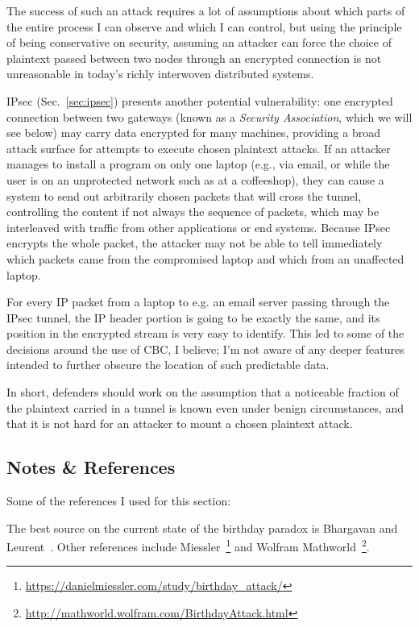 The success of such an attack requires a lot of assumptions about
which parts of the entire process I can observe and which I can
control, but using the principle of being conservative on security,
assuming an attacker can force the choice of plaintext passed between
two nodes through an encrypted connection is not unreasonable in
today's richly interwoven distributed systems.

IPsec (Sec.~\ref{sec:ipsec}) presents another potential vulnerability:
one encrypted connection between two gateways (known as a
\emph{Security Association}, which we will see below) may carry data
encrypted for many machines, providing a broad attack surface for
attempts to execute chosen plaintext attacks.  If an attacker manages
to install a program on only one laptop (e.g., via email, or while the
user is on an unprotected network such as at a coffeeshop), they can
cause a system to send out arbitrarily chosen packets that will cross
the tunnel, controlling the content if not always the sequence of
packets, which may be interleaved with traffic from other applications
or end systems.  Because IPsec encrypts the whole packet, the attacker
may not be able to tell immediately which packets came from the
compromised laptop and which from an unaffected laptop.

For every IP packet from a laptop to e.g. an email server passing
through the IPsec tunnel, the IP header portion is going to be exactly
the same, and its position in the encrypted stream is very easy to
identify.  This led to some of the decisions around the use of CBC, I
believe; I'm not aware of any deeper features intended to further
obscure the location of such predictable data.  \ddp{}

In short, defenders should work on the assumption that a noticeable
fraction of the plaintext carried in a tunnel is known even under
benign circumstances, and that it is not hard for an attacker
to mount a chosen plaintext attack.

\subsection{Notes \& References}

Some of the references I used for this section:

The best source on the current state of the birthday paradox is Bhargavan and Leurent~\cite{bhargavan2016practical}.  Other references include Miessler~\footnote{\url{https://danielmiessler.com/study/birthday_attack/}} and Wolfram Mathworld~\footnote{\url{http://mathworld.wolfram.com/BirthdayAttack.html}}.

